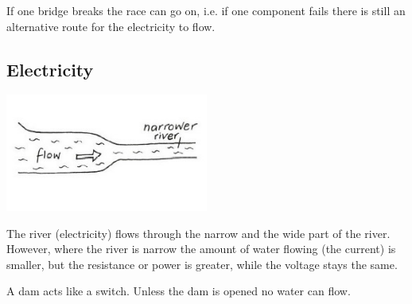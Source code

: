 \begin{multicols}{2}
If one bridge breaks the race can go on, i.e. if one component fails
there is still an alternative route for the electricity to flow.

\subsection*{Electricity}

\begin{center}
\includegraphics[width=0.5\textwidth]{./img/vso/analogy-elec.jpg}
\end{center}

The river (electricity) flows
through the narrow and the wide
part of the river. However, where
the river is narrow the amount of
water flowing (the current) is
smaller, but the resistance or
power is greater, while the
voltage stays the same.

A dam acts like a switch. Unless the dam is opened no water can flow.



\end{multicols}

\pagebreak